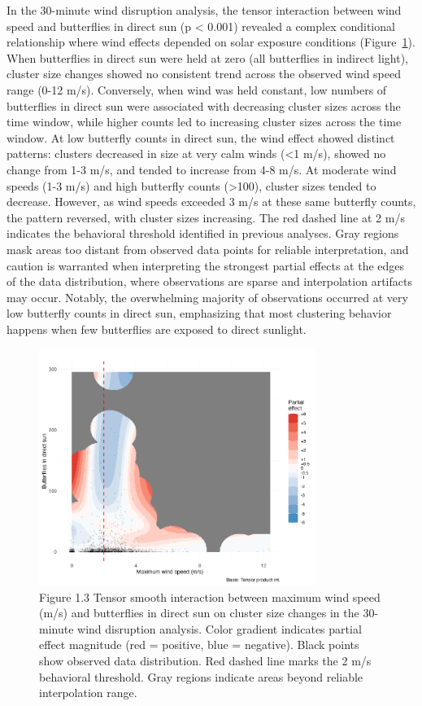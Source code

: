 In the 30-minute wind disruption analysis, the tensor interaction between wind speed and butterflies in direct sun (p < 0.001) revealed a complex conditional relationship where wind effects depended on solar exposure conditions (Figure~\ref{fig:interaction_wind_sun}). When butterflies in direct sun were held at zero (all butterflies in indirect light), cluster size changes showed no consistent trend across the observed wind speed range (0-12 m/s). Conversely, when wind was held constant, low numbers of butterflies in direct sun were associated with decreasing cluster sizes across the time window, while higher counts led to increasing cluster sizes across the time window. At low butterfly counts in direct sun, the wind effect showed distinct patterns: clusters decreased in size at very calm winds (<1 m/s), showed no change from 1-3 m/s, and tended to increase from 4-8 m/s. At moderate wind speeds (1-3 m/s) and high butterfly counts (>100), cluster sizes tended to decrease. However, as wind speeds exceeded 3 m/s at these same butterfly counts, the pattern reversed, with cluster sizes increasing. The red dashed line at 2 m/s indicates the behavioral threshold identified in previous analyses. Gray regions mask areas too distant from observed data points for reliable interpretation, and caution is warranted when interpreting the strongest partial effects at the edges of the data distribution, where observations are sparse and interpolation artifacts may occur. Notably, the overwhelming majority of observations occurred at very low butterfly counts in direct sun, emphasizing that most clustering behavior happens when few butterflies are exposed to direct sunlight. 

\begin{figure}[htbp]
    \centering
    \includegraphics[width=0.8\textwidth]{supplemental/results/30_min/figures/interaction_wind_x_sun_binned.png}
    \caption{Figure 1.3 Tensor smooth interaction between maximum wind speed (m/s) and butterflies in direct sun on cluster size changes in the 30-minute wind disruption analysis. Color gradient indicates partial effect magnitude (red = positive, blue = negative). Black points show observed data distribution. Red dashed line marks the 2 m/s behavioral threshold. Gray regions indicate areas beyond reliable interpolation range.}
    \label{fig:interaction_wind_sun}
\end{figure}

